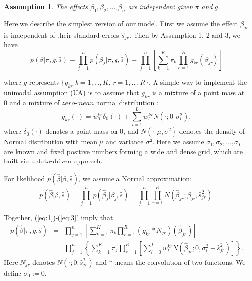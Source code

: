 \documentclass[11pt]{article}
\newtheorem{assumption}{Assumption}
\begin{document}
\begin{assumption} The effects $\beta_1,\beta_2,\ldots,\beta_n$ are independent given $\pi$ and $g$.
\end{assumption}

Here we describe the simplest version of our model. First we assume the effect $\beta_{jr}$ is independent of their standard errors $\hat s_{jr}$. Then by Assumption 1, 2 and 3, we have
\begin{equation}
p(\beta|\pi,g,\hat s) = \prod_{j=1}^np(\beta_j|\pi,g,\hat s) = \prod_{j=1}^n \left [\sum_{k=1}^K\pi_k\prod_{r=1}^R  g_{kr}(\beta_{jr})\right ]
\label{eq:1}
\end{equation}

where $g$ represents $\{g_{kr}|k = 1,\ldots,K$, $r=1,\ldots,R\}$. A simple way to implement the unimodal assumption (UA) is to assume that $g_{kr}$ is a mixture of a point mass at 0 and a mixture of $zero$-$mean$ normal distribution \cite{ash}:
\begin{equation}
g_{kr}(\cdot) =  w_0^{kr}\delta_0(\cdot)+\sum_{l=1}^L w_l^{kr}N(\cdot;0,\sigma_l^2),
\label{eq:2}
\end{equation}
where $\delta_0(\cdot)$ denotes a point mass on 0, and $N(\cdot;\mu,\sigma^2)$ denotes the density of Normal distribution with mean $\mu$ and variance $\sigma^2$. Here we assume  $\sigma_1,\sigma_2,\ldots,\sigma_L$ are known and fixed positive numbers forming a wide and dense grid, which are built via a data-driven approach.

For likelihood $p(\hat \beta|\beta,\hat s)$, we assume a Normal approximation:
\begin{equation}
p(\hat \beta|\beta,\hat s) = \prod_{j=1}^np(\hat \beta_j|\beta_j,\hat s) = \prod_{j=1}^n\prod_{r=1}^RN(\hat\beta_{jr};\beta_{jr},\hat s_{jr}^2).
\label{eq:3}
\end{equation}

Together, (\ref{eq:1})-(\ref{eq:3}) imply that 
\begin{eqnarray}
p(\hat\beta|\pi,g,\hat s) &=& \prod_{j=1}^n\left[\sum_{k=1}^K\pi_k\prod_{r=1}^R(g_{kr}*N_{jr})(\hat\beta_{jr})\right] \nonumber \\ 
&=& \prod_{j=1}^n\left\{\sum_{k=1}^K\pi_k\prod_{r=1}^R\left[ \sum_{l=0}^Lw_l^{kr}N(\hat\beta_{jr};0,\sigma_l^2+\hat s_{jr}^2)\right]\right\}.
\label{eq:4}
\end{eqnarray}
Here $N_{jr}$ denotes $N(\cdot;0,\hat s_{jr}^2)$ and $*$ means the convolution of two functions. We define $\sigma_0:=0$.
\end{document}
